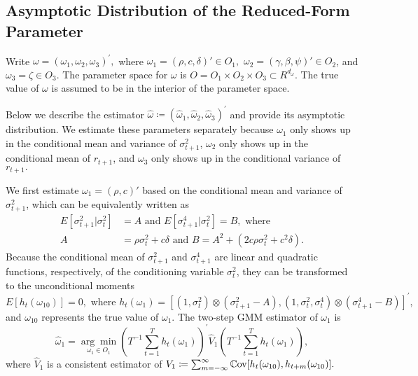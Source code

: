 \subsection{Asymptotic Distribution of the Reduced-Form Parameter}

Write $\omega = (\omega _{1},\omega _{2},\omega _{3})^{\prime },$ where $\omega _{1}=(\rho ,c,\delta)' \in O_{1},$ $\omega _{2}=(\gamma ,\beta ,\psi)' \in O_{2}$, and $\omega _{3}=\zeta \in O_{3}.$ The parameter space for $ \omega $ is $O=O_{1}\times O_{2}\times O_{3}\subset R^{d_{\omega }}$. The true value of $\omega $ is assumed to be in the interior of the parameter
space.

Below we describe the estimator $\widehat{\omega } \coloneqq (\widehat{\omega }_{1}, \widehat{\omega }_{2},\widehat{\omega }_{3})^{\prime }$ and provide its asymptotic distribution. We estimate these parameters separately because $\omega _{1}$ only shows up in the conditional mean and variance of $\sigma _{t+1}^{2}$, $\omega_{2}$ only shows up in the conditional mean of $r_{t+1}$, and $\omega _{3}$ only shows up in the conditional variance of $
r_{t+1}.$

We first estimate $\omega _{1}=(\rho,c)'$ based on the conditional mean and variance of $\sigma _{t+1}^{2}$, which can be equivalently written as 
%
\begin{align}
    E[\sigma _{t+1}^{2}|\sigma _{t}^{2}] &= A\text{ and }E[\sigma _{t+1}^{4}|\sigma _{t}^{2}]=B,\text{ where }  \nonumber \\
%
    A &= \rho \sigma _{t}^{2}+c\delta \text{ and }B=A^{2}+\left( 2c\rho \sigma _{t}^{2}+c^{2}\delta \right) .
\end{align}
%
Because the conditional mean of $\sigma _{t+1}^{2}$ and $\sigma _{t+1}^{4}$ are linear and quadratic functions, respectively, of the conditioning variable $\sigma _{t}^{2}$, they can be transformed to the unconditional moments
%
\begin{equation}
    E[h_{t}(\omega _{10})]=0,\text{ where }h_{t}(\omega _{1})=[(1,\sigma _{t}^{2})\otimes (\sigma _{t+1}^{2}-A),(1,\sigma _{t}^{2},\sigma _{t}^{4})\otimes (\sigma _{t+1}^{4}-B)]^{\prime },
\end{equation}
%
and $\omega _{10}$ represents the true value of $\omega _{1}$. The two-step GMM estimator of $\omega _{1}$ is%
%
\begin{equation}
    \label{omega 1 est}
    \widehat{\omega }_{1}=\underset{\omega _{1}\in O_{1}}{\arg \min }\left( T^{-1}\sum_{t=1}^{T}h_{t}(\omega _{1})\right) ^{\prime }\widehat{V}_{1}\left( T^{-1}\sum_{t=1}^{T}h_{t}(\omega _{1})\right) ,
\end{equation}%
%
where $\widehat{V}_{1}$ is a consistent estimator of $V_{1} \coloneqq \sum_{m=-\infty }^{\infty }\operatorname{\mathbb{C}ov}[h_{t}(\omega _{10}),h_{t+m}(\omega _{10})].$

